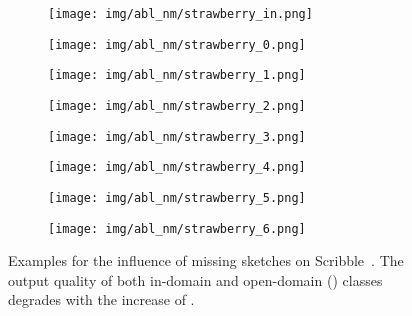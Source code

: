 \documentclass[10pt,twocolumn,letterpaper]{article}
\begin{document}
\begin{figure}[tbp]
\begin{center}
\begin{subfigure}[b]{\nmwidth\linewidth}
  \texttt{[image: img/abl\_nm/strawberry\_in.png]}
  \subcaption{ }\end{subfigure}
  \begin{subfigure}[b]{\nmwidth\linewidth}
  \texttt{[image: img/abl\_nm/strawberry\_0.png]}
  \end{subfigure}
\begin{subfigure}[b]{\nmwidth\linewidth}
  \texttt{[image: img/abl\_nm/strawberry\_1.png]}
  \end{subfigure}
  \begin{subfigure}[b]{\nmwidth\linewidth}
  \texttt{[image: img/abl\_nm/strawberry\_2.png]}
  \end{subfigure}
  \begin{subfigure}[b]{\nmwidth\linewidth}
  \texttt{[image: img/abl\_nm/strawberry\_3.png]}
  \end{subfigure}
  \begin{subfigure}[b]{\nmwidth\linewidth}
  \texttt{[image: img/abl\_nm/strawberry\_4.png]}
  \end{subfigure}
\begin{subfigure}[b]{\nmwidth\linewidth}
  \texttt{[image: img/abl\_nm/strawberry\_5.png]}
  \end{subfigure}
  \begin{subfigure}[b]{\nmwidth\linewidth}
  \texttt{[image: img/abl\_nm/strawberry\_6.png]}
  \end{subfigure}
\end{center}
\caption{Examples for the influence of missing sketches on Scribble~\cite{ghosh2019interactive}. The output quality of both in-domain and open-domain (\textcolor{blue}{}) classes degrades with the increase of .}
 \label{fig:abl_missing}
\end{figure}
\end{document}
